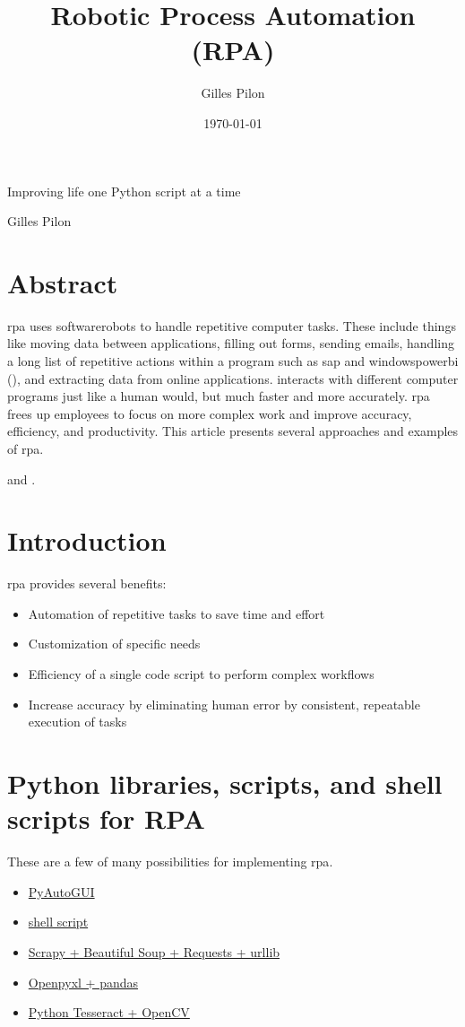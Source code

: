 \documentclass[10pt, letterpaper, twoside]{article}
\title{Robotic Process Automation (RPA)}
\author{Gilles Pilon}
\date{\today}
\begin{document}
\maketitle
\renewcommand{\epigraphflush}{flushleft}
\renewcommand{\textflush}{flushleft}
\renewcommand{\sourceflush}{flushleft}
\epigraph{Improving life one Python script at a time}{Gilles Pilon}
\section*{Abstract}
\Gls{rpa} uses \glspl{softwarerobot} to handle repetitive computer tasks. These include things like moving data between applications, filling out forms, sending emails, handling a long list of repetitive actions within a program such as \Gls{sap} and \Gls{windowspowerbi} (\cite{windowspowerbi}), and extracting data from online applications.  interacts with different computer programs just like a human would, but much faster and more accurately. \Gls{rpa} frees up employees to focus on more complex work and improve accuracy, efficiency, and productivity. This article presents several approaches and examples of \Gls{rpa}.

 and  .

\newpage
\tableofcontents
\newpage
\section{Introduction}\label{sec:introduction}
\Gls{rpa} provides several benefits:
\begin{itemize}
    \item{Automation of repetitive tasks to save time and effort}
    \item{Customization of specific needs}
    \item{Efficiency of a single code script to perform complex workflows}
    \item{Increase accuracy by eliminating human error by consistent, repeatable execution of tasks}
\end{itemize}
\section{Python libraries, scripts, and shell scripts for RPA}\label{sec:python_libraries_scripts_shell_scripts_for_rpa}
These are a few of many possibilities for implementing \Gls{rpa}.
\begin{itemize}
\item \hyperref[sec:pyautogui]{PyAutoGUI}
\item \hyperref[sec:shell_script]{shell script}
\item \hyperref[sec:scrapy]{Scrapy + Beautiful Soup + Requests + urllib}
\item \hyperref[sec:openpyxl_pandas]{Openpyxl + pandas}
\item \hyperref[sec:pytesseract_opencv]{Python Tesseract + OpenCV}
\end{itemize}
\end{document}
